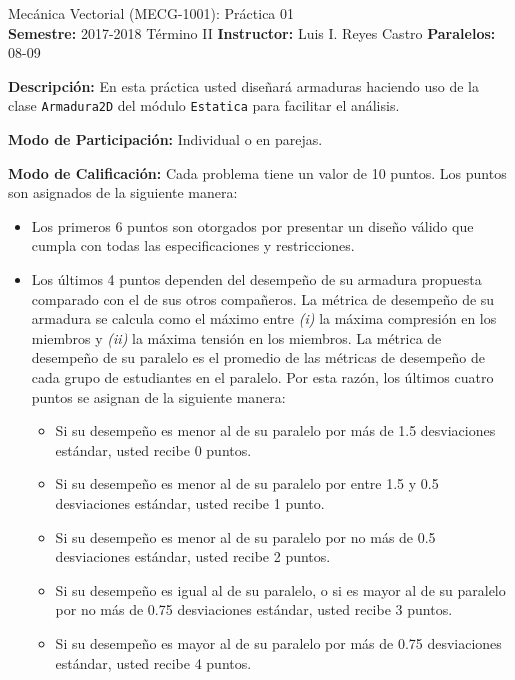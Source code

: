 \documentclass[ a4paper, twoside, 11pt]{article}
\newcommand{\numero}{01}
\begin{document}
\allowdisplaybreaks

\begin{center}
\Large Mec\'anica Vectorial (MECG-1001): Pr\'actica \numero \\[2ex]
\small \textbf{Semestre:} 2017-2018 T\'ermino II \qquad
\textbf{Instructor:} Luis I. Reyes Castro \qquad
\textbf{Paralelos:} 08-09
\end{center}
\fullskip

\textbf{Descripci\'on:} En esta pr\'actica usted dise\~nar\'a armaduras haciendo uso de la clase \texttt{Armadura2D} del m\'odulo \texttt{Estatica} para facilitar el an\'alisis. 
\halfskip

\textbf{Modo de Participaci\'on:} Individual o en parejas. 
\halfskip

\textbf{Modo de Calificaci\'on:} Cada problema tiene un valor de 10 puntos. Los puntos son asignados de la siguiente manera: 
\begin{itemize}
\item Los primeros 6 puntos son otorgados por presentar un dise\~no v\'alido que cumpla con todas las especificaciones y restricciones. 
\item Los \'ultimos 4 puntos dependen del desempe\~no de su armadura propuesta comparado con el de sus otros compa\~neros. La m\'etrica de desempe\~no de su armadura se calcula como el m\'aximo entre \textit{(i)} la m\'axima compresi\'on en los miembros y \textit{(ii)} la m\'axima tensi\'on en los miembros. La m\'etrica de desempe\~no de su paralelo es el promedio de las m\'etricas de desempe\~no de cada grupo de estudiantes en el paralelo. Por esta raz\'on, los \'ultimos cuatro puntos se asignan de la siguiente manera: 
\begin{itemize}
\item Si su desempe\~no es menor al de su paralelo por m\'as de 1.5 desviaciones est\'andar, usted recibe 0 puntos. 
\item Si su desempe\~no es menor al de su paralelo por entre 1.5 y 0.5 desviaciones est\'andar, usted recibe 1 punto. 
\item Si su desempe\~no es menor al de su paralelo por no m\'as de 0.5 desviaciones est\'andar, usted recibe 2 puntos. 
\item Si su desempe\~no es igual al de su paralelo, o si es mayor al de su paralelo por no m\'as de 0.75 desviaciones est\'andar, usted recibe 3 puntos. 
\item Si su desempe\~no es mayor al de su paralelo por m\'as de 0.75 desviaciones est\'andar, usted recibe 4 puntos. 
\end{itemize}

\end{itemize}
\halfskip
\end{document}
